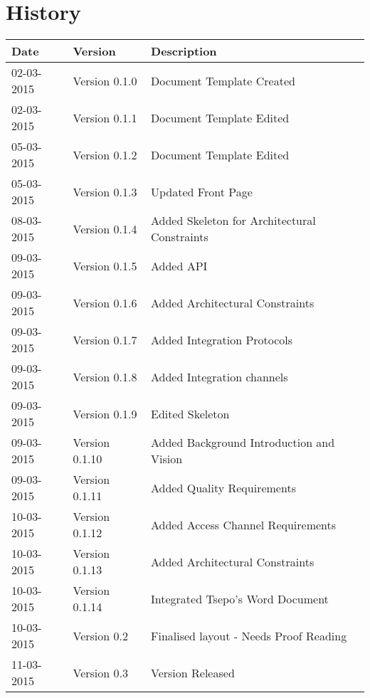 \documentclass[10pt]{article}
\begin{document}


\section{History}
\begin{tabular}{|l|l|l|}

\hline
Date & Version & Description\\ %
\hline
02-03-2015 & Version 0.1.0 & Document Template Created\\ %
02-03-2015 & Version 0.1.1 & Document Template Edited\\ %
05-03-2015 & Version 0.1.2 & Document Template Edited\\ %
05-03-2015 & Version 0.1.3 & Updated Front Page \\ %
08-03-2015 & Version 0.1.4 & Added Skeleton for Architectural Constraints \\ %
09-03-2015 & Version 0.1.5 & Added API \\ %
09-03-2015 & Version 0.1.6 & Added Architectural Constraints \\ %
09-03-2015 & Version 0.1.7 & Added Integration Protocols \\ %
09-03-2015 & Version 0.1.8 & Added Integration channels  \\ %
09-03-2015 & Version 0.1.9 & Edited Skeleton \\ %
09-03-2015 & Version 0.1.10 & Added Background Introduction and Vision \\ %
09-03-2015 & Version 0.1.11 & Added Quality Requirements \\ %
10-03-2015 & Version 0.1.12 & Added Access Channel Requirements \\ %
10-03-2015 & Version 0.1.13 & Added Architectural Constraints \\ %
10-03-2015 & Version 0.1.14 & Integrated Tsepo's Word Document \\ %
10-03-2015 & Version 0.2 & Finalised layout - Needs Proof Reading \\ %
11-03-2015 & Version 0.3 & Version Released \\ %
\end{tabular}
\newpage
\tableofcontents
\newpage
\end{document}

